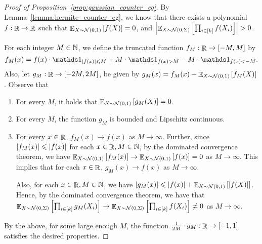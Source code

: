 \begin{proof}[Proof of Proposition~\ref{prop:gaussian_counter_eg}]
By Lemma~\ref{lemma:hermite_counter_eg}, we know that there exists a polynomial $f:\mathop{\mathbb{R}}\to \mathop{\mathbb{R}}$ such that $\mathop{\mathbb{E}}_{X\sim \mathcal N(0,1)} \left[ f(X) \right] = 0$, and $\left|\mathop{\mathbb{E}}_{X\sim \mathcal N(0, \Sigma)}\left[ \prod_{i\in [k]} f(X_i) \right]\right| > 0$.

For each integer $M\in \mathbb{N}$, we define the truncated function $f_M:\mathop{\mathbb{R}}\to [-M,M]$ by 
\[f_M(x) = f(x)\cdot \ind_{\abs{f(x)}\leq M} + M\cdot \ind_{f(x) > M} - M\cdot \ind_{f(x) < -M}.\]
Also, let $g_M:\mathop{\mathbb{R}}\to [-2M,2M]$, be given by $g_M(x) = f_M(x) - \mathop{\mathbb{E}}_{X\sim \mathcal N(0,1)}\left[ f_M(X) \right]$.
Observe that
\begin{enumerate}
	\item For every $M$, it holds that $\mathop{\mathbb{E}}_{X\sim \mathcal N(0,1)}\left[ g_M(X) \right] = 0$.
	\item For every $M$, the function $g_M$ is bounded and Lipschitz continuous.
	\item For every $x\in \mathop{\mathbb{R}}$, $f_M(x)\to f(x)$ as $M\to \infty$. Further, since $\left|f_M(x)\right| \leqslant \left|f(x)\right|$ for each $x\in \mathop{\mathbb{R}}, M\in \mathbb{N}$, by the dominated convergence theorem, we have  $\mathop{\mathbb{E}}_{X\sim \mathcal N(0,1)}\left[ f_M(x) \right]\to \mathop{\mathbb{E}}_{X\sim \mathcal N(0,1)}\left[ f(x) \right]=0$ as $M\to \infty$.
	This implies that for each $x\in \mathop{\mathbb{R}}$, $g_M(x)\to f(x)$ as $M\to \infty$.

	Also, for each $x\in \mathop{\mathbb{R}}, M\in \mathbb{N}$, we have $\left|g_M(x)\right| \leqslant \left|f(x)\right| + \mathop{\mathbb{E}}_{X\sim \mathcal N(0,1)}\left[ \left|f(X)\right| \right]$. Hence, by the dominated convergence theorem, we have that $\mathop{\mathbb{E}}_{X\sim \mathcal N(0, \Sigma)}\left[ \prod_{i\in [k]} g_M(X_i) \right] \to \mathop{\mathbb{E}}_{X\sim \mathcal N(0, \Sigma)}\left[ \prod_{i\in [k]} f(X_i) \right] \not= 0$ as $M\to \infty$.
\end{enumerate}

By the above, for some large enough $M$, the function $\frac{1}{2M}\cdot g_M:\mathop{\mathbb{R}}\to [-1,1]$ satisfies the desired properties.
\end{proof}

